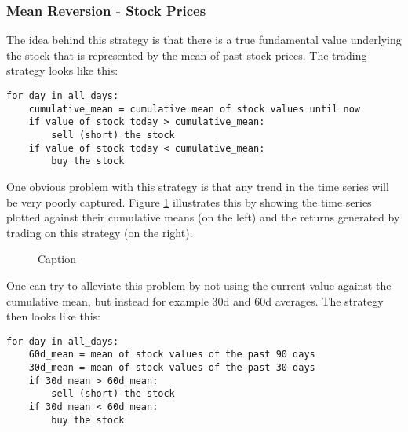 \subsubsection{Mean Reversion - Stock Prices}
The idea behind this strategy is that there is a true fundamental value underlying the stock that is represented by the mean of past stock prices. The trading strategy looks like this: 

\begin{verbatim}
for day in all_days: 
    cumulative_mean = cumulative mean of stock values until now
    if value of stock today > cumulative_mean:
        sell (short) the stock
    if value of stock today < cumulative_mean:
        buy the stock
\end{verbatim}

One obvious problem with this strategy is that any trend in the time series will be very poorly captured. Figure \ref{fig:mean_reversion_cum_mean} illustrates this by showing the time series plotted against their cumulative means (on the left) and the returns generated by trading on this strategy (on the right). 
\begin{figure}[h!]
    \centering
    \begin{minipage}[b]{0.49\textwidth}
        \centering
            \begin{adjustbox}{width=\textwidth,center}
                
            \end{adjustbox}
    \end{minipage}
    \hfill
    \begin{minipage}[b]{0.49\textwidth}
        \centering
        \begin{adjustbox}{width=\textwidth,center}
            
        \end{adjustbox}
    \end{minipage}
    \caption{Caption}
    \label{fig:mean_reversion_cum_mean}
\end{figure}{}

One can try to alleviate this problem by not using the current value against the cumulative mean, but instead for example 30d and 60d averages. The strategy then looks like this: 

\begin{verbatim}
for day in all_days: 
    60d_mean = mean of stock values of the past 90 days
    30d_mean = mean of stock values of the past 30 days
    if 30d_mean > 60d_mean:
        sell (short) the stock
    if 30d_mean < 60d_mean:
        buy the stock
\end{verbatim}

